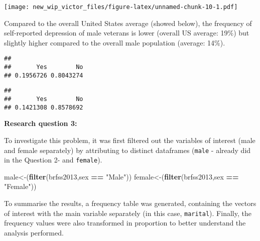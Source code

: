 \documentclass[]{article}
\newenvironment{Shaded}{\begin{snugshade}}{\end{snugshade}}
\newcommand{\KeywordTok}[1]{\textcolor[rgb]{0.13,0.29,0.53}{\textbf{#1}}}
\newcommand{\NormalTok}[1]{#1}
\newcommand{\OperatorTok}[1]{\textcolor[rgb]{0.81,0.36,0.00}{\textbf{#1}}}
\newcommand{\StringTok}[1]{\textcolor[rgb]{0.31,0.60,0.02}{#1}}
\begin{document}
\texttt{[image: new\_wip\_victor\_files/figure-latex/unnamed-chunk-10-1.pdf]}

Compared to the overall United States average (showed below), the
frequency of self-reported depression of male veterans is lower (overall
US average: 19\%) but slightly higher compared to the overall male
population (average: 14\%).

\begin{Shaded}
\end{Shaded}

\begin{verbatim}
## 
##       Yes        No 
## 0.1956726 0.8043274
\end{verbatim}

\begin{Shaded}
\end{Shaded}

\begin{verbatim}
## 
##       Yes        No 
## 0.1421308 0.8578692
\end{verbatim}

\textbf{Research question 3:}

To investigate this problem, it was first filtered out the variables of
interest (male and female separately) by attributing to distinct
dataframes (\texttt{male} - already did in the Question 2- and
\texttt{female}).

\begin{Shaded}
\begin{Highlighting}[]
\NormalTok{male<-(}\KeywordTok{filter}\NormalTok{(brfss2013,sex }\OperatorTok{==}\StringTok{ "Male"}\NormalTok{))}
\NormalTok{female<-(}\KeywordTok{filter}\NormalTok{(brfss2013,sex }\OperatorTok{==}\StringTok{ "Female"}\NormalTok{))}
\end{Highlighting}
\end{Shaded}

To summarise the results, a frequency table was generated, containing
the vectors of interest with the main variable separately (in this case,
\texttt{marital}). Finally, the frequency values were also transformed
in proportion to better understand the analysis performed.
\end{document}
